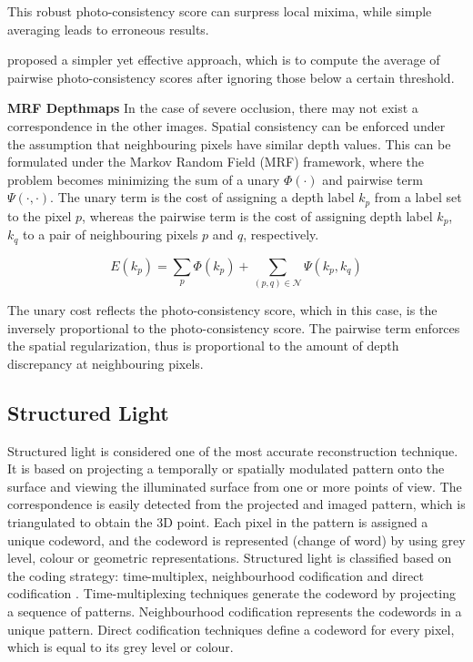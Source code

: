 This robust photo-consistency score can surpress local mixima, while simple averaging leads to erroneous results.


\citeauthor{goesele2006multi} proposed a simpler yet effective approach, which is to compute the average of pairwise photo-consistency scores after ignoring those below a certain threshold.

\textbf{MRF Depthmaps} In the case of severe occlusion, there may not exist a correspondence in the other images. Spatial consistency can be enforced under the assumption that neighbouring pixels have similar depth values. This can be formulated under the Markov Random Field (MRF) framework, where the problem becomes minimizing the sum of a unary $\Phi(\cdot)$ and pairwise term $\Psi(\cdot, \cdot)$. The unary term is the cost of assigning a depth label $k_p$ from a label set to the pixel $p$, whereas the pairwise term is the cost of assigning depth label $k_p$, $k_q$ to a pair of neighbouring pixels $p$ and $q$, respectively.

\begin{equation}
E(k_p)= \sum_p \Phi(k_p) + \sum_{(p,q)\in\mathcal{N}}\Psi(k_p, k_q)
\end{equation}

The unary cost reflects the photo-consistency score, which in this case, is the inversely proportional to the photo-consistency score. The pairwise term enforces the spatial regularization, thus is proportional to the amount of depth discrepancy at neighbouring pixels. 

\subsection{Structured Light}
Structured light is considered one of the most accurate reconstruction technique. It is based on projecting a temporally or spatially modulated pattern onto the surface and viewing the illuminated surface from one or more points of view. The correspondence is easily detected from the projected and imaged pattern, which is triangulated to obtain the 3D point. Each pixel in the pattern is assigned a unique codeword, and the codeword is represented (change of word) by using grey level, colour or geometric representations. Structured light is classified based on the coding strategy: time-multiplex, neighbourhood codification and direct codification \cite{salvi2004pattern}. Time-multiplexing techniques generate the codeword by projecting a sequence of patterns. Neighbourhood codification represents the codewords in a unique pattern. Direct codification techniques define a codeword for every pixel, which is equal to its grey level or colour.

